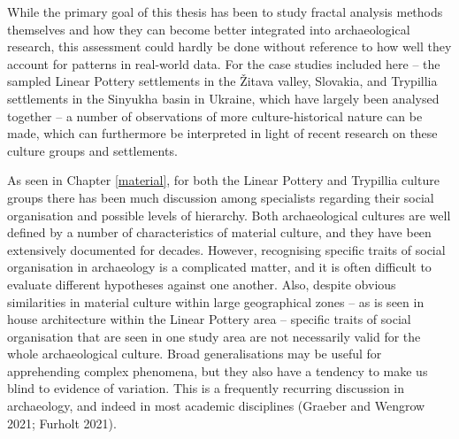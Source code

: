 \documentclass[
  12pt,
  a4paper, twoside]{book}
\begin{document}
While the primary goal of this thesis has been to study fractal analysis methods themselves and how they can become better integrated into archaeological research, this assessment could hardly be done without reference to how well they account for patterns in real-world data. For the case studies included here -- the sampled Linear Pottery settlements in the Žitava valley, Slovakia, and Trypillia settlements in the Sinyukha basin in Ukraine, which have largely been analysed together -- a number of observations of more culture-historical nature can be made, which can furthermore be interpreted in light of recent research on these culture groups and settlements.

As seen in Chapter \ref{material}, for both the Linear Pottery and Trypillia culture groups there has been much discussion among specialists regarding their social organisation and possible levels of hierarchy. Both archaeological cultures are well defined by a number of characteristics of material culture, and they have been extensively documented for decades. However, recognising specific traits of social organisation in archaeology is a complicated matter, and it is often difficult to evaluate different hypotheses against one another. Also, despite obvious similarities in material culture within large geographical zones -- as is seen in house architecture within the Linear Pottery area -- specific traits of social organisation that are seen in one study area are not necessarily valid for the whole archaeological culture. Broad generalisations may be useful for apprehending complex phenomena, but they also have a tendency to make us blind to evidence of variation. This is a frequently recurring discussion in archaeology, and indeed in most academic disciplines (Graeber and Wengrow 2021; Furholt 2021).
\end{document}
